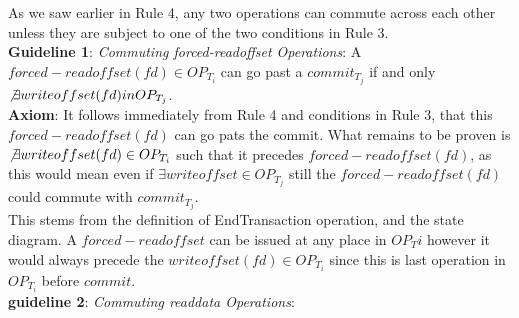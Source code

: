 \documentclass[a4paper, 11pt]{article}
\begin{document}
As we saw earlier in Rule 4, any two operations can commute across each other unless they are subject to one of the two conditions in Rule 3.\\  

\textbf{Guideline 1}: \emph{Commuting forced-readoffset Operations}: A $forced-readoffset(fd) \in OP_{T_i}$ can go past a $commit_{T_j}$ if and only $\not \exists writeoffset(fd) in OP_{T_j}$.\\

\textbf{Axiom}: It follows immediately from Rule 4 and conditions in Rule 3, that this $forced-readoffset(fd)$ can go pats the commit. What remains to be proven is  $ \not \exists writeoffset(fd) \in OP_{T_i}$ such that it precedes 
$forced-readoffset(fd)$, as this would mean even if $\exists writeoffset \in OP_{T_j}$ still the $forced-readoffset(fd)$ could commute with $commit_{T_j}$.\\

This stems from the definition of EndTransaction operation, and the state diagram. A $forced-readoffset$ can be issued at any place in $OP_T{i}$ however it would always precede the $writeoffset(fd) \in OP_{T_i}$ since this is last operation in $OP_{T_i}$ before $commit$.\\

\textbf{guideline 2}: \emph{Commuting readdata Operations}:%

\end{document}
